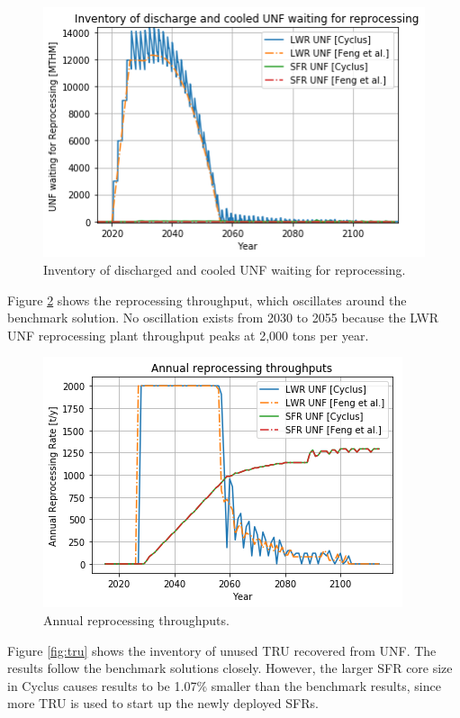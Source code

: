 \begin{figure}[htbp!]
	\begin{center}
		\includegraphics[scale=0.7]{./images/results_18/waiting_monthly.png}
	\end{center}
	\caption{Inventory of discharged and cooled \gls{UNF} waiting for reprocessing.}
	\label{fig:waiting_monthly}
\end{figure}


Figure \ref{fig:rep} shows the reprocessing throughput, which oscillates around
the benchmark solution. No oscillation exists from 2030 to 2055 because the
\gls{LWR} \gls{UNF} reprocessing plant throughput peaks at 2,000 tons per year.

\begin{figure}[htbp!]
	\begin{center}
		\includegraphics[scale=0.7]{./images/results_18/rep.png}
	\end{center}
	\caption{Annual reprocessing throughputs.}
	\label{fig:rep}
\end{figure}


Figure \ref{fig:tru} shows the inventory of unused \gls{TRU} recovered from \gls{UNF}.
The \Cyclus results follow the benchmark solutions closely. However,
the larger \gls{SFR} core size in Cyclus causes \Cyclus results to be 1.07\% smaller than the benchmark results,
since more \gls{TRU} is used to
start up the newly deployed \glspl{SFR}.

